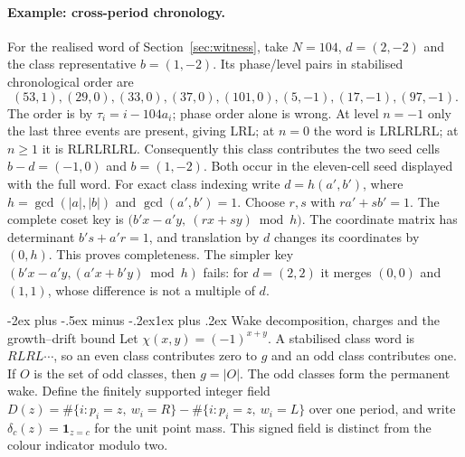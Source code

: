 \documentclass[11pt,letterpaper]{article}
\makeatletter
\renewcommand\section{\@startsection{section}{1}{\z@}%
  {-2ex plus -.5ex minus -.2ex}{1ex plus .2ex}%
  {\normalfont\Large\bfseries}}
\newcommand{\che}{\chi}
\makeatother
\begin{document}
\paragraph{Example: cross-period chronology.}\label{ex:chronology}
For the realised word of Section~\ref{sec:witness}, take $N=104$,
$d=(2,-2)$ and the class representative $b=(1,-2)$. Its phase/level pairs in stabilised chronological order are
\[
(53,1),(29,0),(33,0),(37,0),(101,0),(5,-1),(17,-1),(97,-1).
\]
The order is by $\tau_i=i-104a_i$; phase order alone is wrong.
At level $n=-1$ only the last three events are present, giving LRL;
at $n=0$ the word is LRLRLRL; at $n\ge1$ it is RLRLRLRL.
Consequently this class contributes the two seed cells
$b-d=(-1,0)$ and $b=(1,-2)$. Both occur in the eleven-cell seed displayed with the full word.
For exact class indexing write $d=h(a',b')$, where
$h=\gcd(|a|,|b|)$ and $\gcd(a',b')=1$. Choose $r,s$ with
$ra'+sb'=1$. The complete coset key is
$\bigl(b'x-a'y,\ (rx+sy)\bmod h\bigr)$.
The coordinate matrix has determinant $b's+a'r=1$, and translation by
$d$ changes its coordinates by $(0,h)$. This proves completeness.
The simpler key $(b'x-a'y,(a'x+b'y)\bmod h)$ fails: for $d=(2,2)$
it merges $(0,0)$ and $(1,1)$, whose difference is not a multiple of $d$.

\section{Wake decomposition, charges and the growth--drift bound}
Let $\che(x,y)=(-1)^{x+y}$. A stabilised class word is
$RLRL\cdots$, so an even class contributes zero to $g$ and an odd
class contributes one. If $O$ is the set of odd classes, then $g=|O|$.
The odd classes form the permanent wake. Define the finitely supported
integer field
$D(z)=\#\{i:p_i=z,\ w_i=R\}-\#\{i:p_i=z,\ w_i=L\}$
over one period, and write $\delta_c(z)=\mathbf1_{z=c}$ for the unit
point mass. This signed field is distinct from the colour indicator modulo two.
\end{document}

